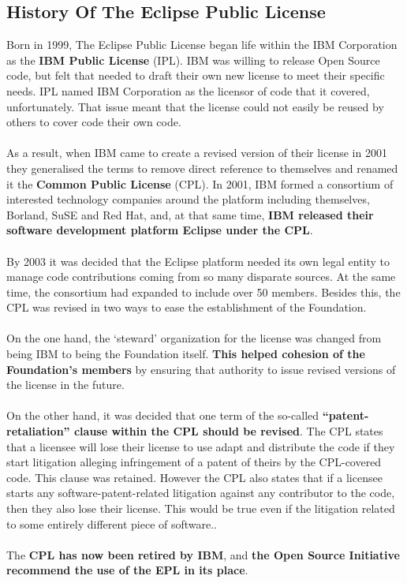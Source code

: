 \documentclass[a4paper, 12pt]{book}
\begin{document}
\subsection{History Of The Eclipse Public License}
Born in 1999, The Eclipse Public License began life within the IBM Corporation as the \textbf{IBM Public License} (IPL). IBM was willing to release Open Source code, but felt that needed to draft their own new license to meet their specific needs. IPL named IBM Corporation as the licensor of code that it covered, unfortunately. That issue meant that the license could not easily be reused by others to cover code their own code.\\
\\
As a result, when IBM came to create a revised version of their license in 2001 they generalised the terms to remove direct reference to themselves and renamed it the \textbf{Common Public License} (CPL). In 2001, IBM formed a consortium of interested technology companies around the platform including themselves, Borland, SuSE and Red Hat, and, at that same time, \textbf{IBM released their software development platform Eclipse under the CPL}.\\
\\
By 2003 it was decided that the Eclipse platform needed its own legal entity to manage code contributions coming from so many disparate sources. At the same time, the consortium had expanded to include over 50 members. Besides this, the CPL was revised in two ways to ease the establishment of the Foundation.\\
\\
On the one hand, the ‘steward’ organization for the license was changed from being IBM to being the Foundation itself. \textbf{This helped cohesion of the Foundation’s members} by ensuring that authority to issue revised versions of the license in the future.\\
\\
On the other hand, it was decided that one term of the so-called \textbf{``patent-retaliation'' clause within the CPL should be revised}. The CPL states that a licensee will lose their license to use adapt and distribute the code if they start litigation alleging infringement of a patent of theirs by the CPL-covered code. This clause was retained. However the CPL also states that if a licensee starts any software-patent-related litigation against any contributor to the code, then they also lose their license. This would be true even if the litigation related to some entirely different piece of software..\\
\\
The \textbf{CPL has now been retired by IBM}, and \textbf{the Open Source Initiative recommend the use of the EPL in its place}.
\end{document}
